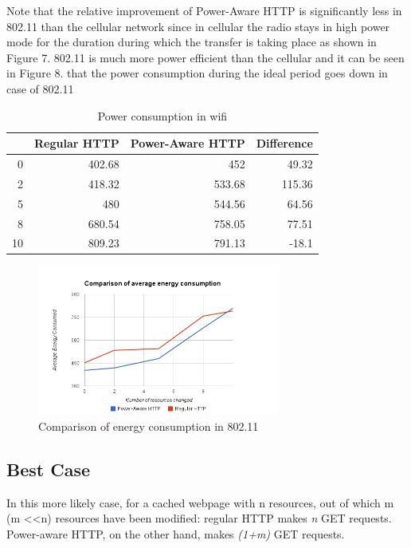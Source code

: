 \documentclass{sigplanconf}
\begin{document}
Note that the relative improvement of Power-Aware HTTP is significantly less in 802.11 than the cellular network since in cellular the radio stays in high power mode for the duration during which the transfer is taking place as shown in Figure 7. 802.11 is much more power efficient than the cellular and it can be seen in Figure 8. that the power consumption during the ideal period goes down in case of 802.11


\begin{table}[htbp]
\centering
\caption{Power consumption in wifi}
\begin{tabular}{|r|r|r|r|}
\hline
\multicolumn{1}{|l|}{} & \multicolumn{1}{l|}{Regular HTTP} & \multicolumn{1}{l|}{Power-Aware HTTP} & \multicolumn{1}{l|}{Difference} \\ \hline
0 & 402.68 & 452 & 49.32 \\ \hline
2 & 418.32 & 533.68 & 115.36 \\ \hline
5 & 480 & 544.56 & 64.56 \\ \hline
8 & 680.54 & 758.05 & 77.51 \\ \hline
10 & 809.23 & 791.13 & -18.1 \\ \hline
\end{tabular}
\label{}
\end{table}

\begin{figure}[ht!]
\centering
\includegraphics[width=80mm]{avg_energy_wifi.png}
\caption{Comparison of energy consumption in 802.11}
\label{fig:sp_gd_mnist}
\end{figure}




\subsection{Best Case}

In this more likely case, for a cached webpage with n resources, out of which m (m \textless \textless n) resources have been modified: regular HTTP makes {\it n} GET requests. Power-aware HTTP, on the other hand, makes {\it (1+m)} GET requests.
\end{document}
